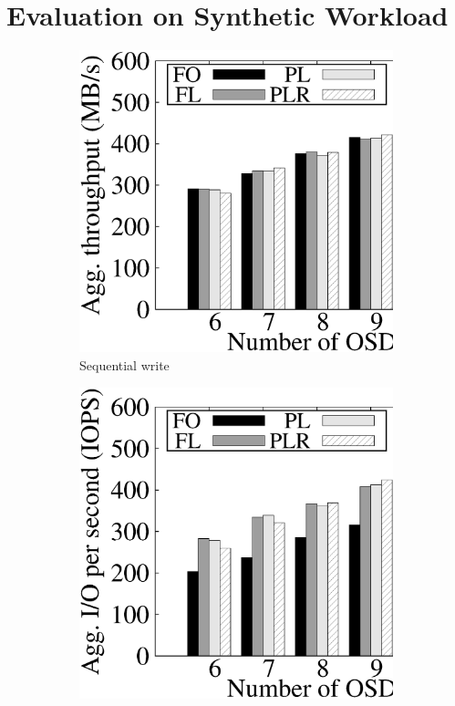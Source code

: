 \section{Evaluation on Synthetic Workload}
\label{eval:synthetic}

\begin{figure}[t]
\centering
 \begin{subfigure}[t]{0.48\linewidth}
     \includegraphics[width=\linewidth]{charts/seq_write/eps/seq_write}
     \caption{Sequential write}
	 \label{fig:seq_write}
 \end{subfigure}
 \begin{subfigure}[t]{0.48\linewidth}
     \includegraphics[width=\linewidth]{charts/rand_write/eps/rand_write}

\end{subfigure}
\end{figure}
